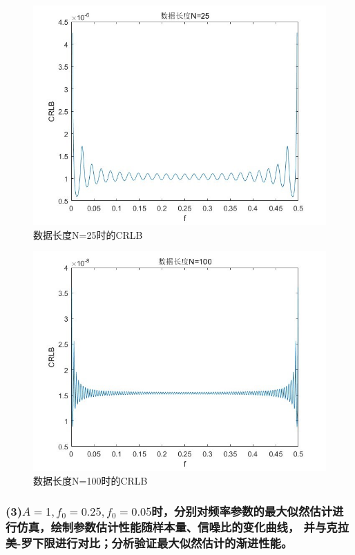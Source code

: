 \documentclass[fontset=windows]{article}
\numberwithin{figure}{section}
\begin{document}
\begin{figure}[H]
	\centering
	\includegraphics[scale=0.7]{fig2.jpg}
	\caption{数据长度N=25时的CRLB}
	\label{2.2.2}
\end{figure}

\begin{figure}[H]
	\centering
	\includegraphics[scale=0.7]{fig3.jpg}
	\caption{数据长度N=100时的CRLB}
	\label{2.2.3}
\end{figure}

\subsubsection*{(3)\(A=1,f_0=0.25,f_0=0.05\)时，分别对频率参数的最大似然估计进行仿真，绘制参数估计性能随样本量、信噪比的变化曲线，
	并与克拉美-罗下限进行对比；分析验证最大似然估计的渐进性能。}
\end{document}
